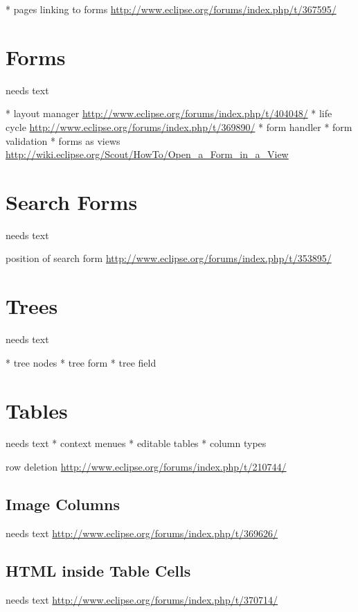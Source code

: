 \documentclass[a4paper,10pt,twoside]{book}
\begin{document}
	* pages linking to forms \url{http://www.eclipse.org/forums/index.php/t/367595/}

\section{Forms}
needs text

    * layout manager \url{http://www.eclipse.org/forums/index.php/t/404048/}
    * life cycle \url{http://www.eclipse.org/forums/index.php/t/369890/}
	* form handler
	* form validation
	* forms as views \url{http://wiki.eclipse.org/Scout/HowTo/Open_a_Form_in_a_View}

\section{Search Forms}
needs text

position of search form \url{http://www.eclipse.org/forums/index.php/t/353895/}

\section{Trees}
needs text

    * tree nodes
	* tree form
	* tree field

\section{Tables}
needs text
	* context menues
	* editable tables
    * column types

row deletion \url{http://www.eclipse.org/forums/index.php/t/210744/}

\subsection{Image Columns}
needs text
\url{http://www.eclipse.org/forums/index.php/t/369626/}

\subsection{HTML inside Table Cells}
needs text
\url{http://www.eclipse.org/forums/index.php/t/370714/}
\end{document}
